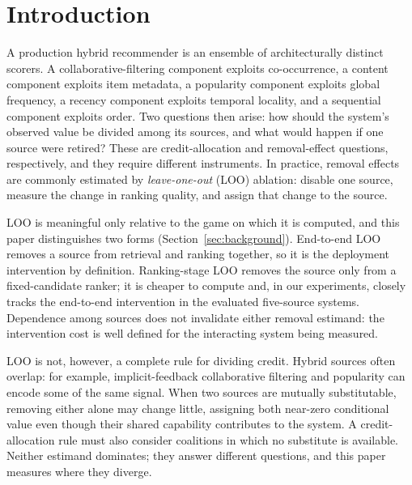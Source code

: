 \documentclass[pdflatex,sn-basic,Numbered]{sn-jnl}
\theoremstyle{plain}
\theoremstyle{definition}
\begin{document}

\maketitle

\section{Introduction}\label{sec:intro}

A production hybrid recommender is an ensemble of architecturally distinct
scorers. A collaborative-filtering component exploits co-occurrence, a content
component exploits item metadata, a popularity component exploits global
frequency, a recency component exploits temporal locality, and a sequential
component exploits order. Two questions then arise: how should the system's
observed value be divided among its sources, and what would happen if one source
were retired? These are credit-allocation and removal-effect questions,
respectively, and they require different instruments. In practice, removal
effects are commonly estimated by \emph{leave-one-out} (LOO) ablation: disable
one source, measure the change in ranking quality, and assign that change to the
source.

LOO is meaningful only relative to the game on which it is computed, and this
paper distinguishes two forms (Section~\ref{sec:background}). End-to-end LOO
removes a source from retrieval and ranking together, so it is the deployment
intervention by definition. Ranking-stage LOO removes the source only from a
fixed-candidate ranker; it is cheaper to compute and, in our experiments,
closely tracks the end-to-end intervention in the evaluated five-source
systems. Dependence among sources does not
invalidate either removal estimand: the intervention cost is well defined for
the interacting system being measured.

LOO is not, however, a complete rule for dividing credit. Hybrid sources often
overlap: for example, implicit-feedback collaborative filtering and popularity
can encode some of the same signal. When two sources are mutually
substitutable, removing either alone may change little, assigning both
near-zero conditional value even though their shared capability contributes to
the system. A credit-allocation rule must also consider coalitions in which no
substitute is available. Neither estimand dominates; they answer different
questions, and this paper measures where they diverge.
\end{document}
